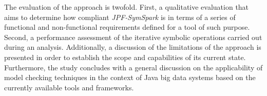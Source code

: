 The evaluation of the approach is twofold. First, a qualitative evaluation that aims to determine how compliant \textit{JPF-SymSpark} is in terms of a series of functional and non-functional requirements defined for a tool of such purpose. Second, a performance assessment of the iterative symbolic operations carried out during an analysis. Additionally, a discussion of the limitations of the approach is presented in order to establish the scope and capabilities of its current state. Furthermore, the study concludes with a general discussion on the applicability of model checking techniques in the context of Java big data systems based on the currently available tools and frameworks.